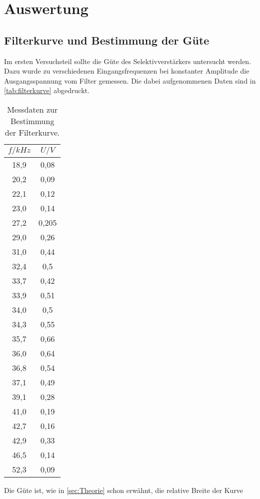 \section{Auswertung}
\label{sec:Auswertung}

\subsection{Filterkurve und Bestimmung der Güte}
\label{sec:Filterkurve und Bestimmung der Güte}

Im ersten Versuchsteil sollte die Güte des Selektivverstärkers untersucht werden. Dazu
wurde zu verschiedenen Eingangsfrequenzen bei konstanter Amplitude die Ausgangsspannung
vom Filter gemessen. Die dabei aufgenommenen Daten sind in \autoref{tab:filterkurve}
abgedruckt.

\begin{table}
  \centering
  \caption{Messdaten zur Bestimmung der Filterkurve.}
  \label{tab:filterkurve}
  \begin{tabular}{c c}
  \toprule
  $f / \si{kHz}$	& $U / \si{V}$ \\
  \midrule
  18,9&0,08	\\
  20,2&0,09	\\
  22,1&0,12	\\
  23,0&0,14	\\
  27,2&0,205	\\
  29,0&0,26	\\
  31,0&0,44	\\
  32,4&0,5	\\
  33,7&0,42	\\
  33,9&0,51	\\
  34,0&0,5	\\
  34,3&0,55	\\
  35,7&0,66	\\
  36,0&0,64	\\
  36,8&0,54	\\
  37,1&0,49	\\
  39,1&0,28	\\
  41,0&0,19	\\
  42,7&0,16	\\
  42,9&0,33	\\
  46,5&0,14	\\
  52,3&0,09	\\
  \bottomrule
  \end{tabular}
\end{table}
Die Güte ist, wie in \autoref{sec:Theorie} schon erwähnt, die relative Breite der Kurve
